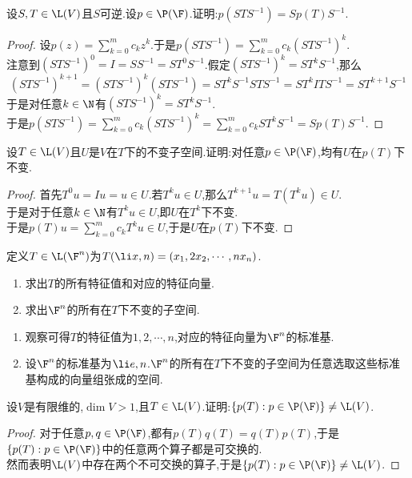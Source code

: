 \documentclass{ctexart}
\begin{document}
\begin{problem}[40.]
    设$S,T\in\L(V)$且$S$可逆.设$p\in\P(\F)$.证明:$p(STS^{-1})=Sp(T)S^{-1}$.
\end{problem}
\begin{proof}
    设$p(z)=\displaystyle\sum_{k=0}^{m}c_kz^k$.于是$\displaystyle p(STS^{-1})=\sum_{k=0}^{m}c_k(STS^{-1})^k$.\\
    注意到$(STS^{-1})^{0}=I=SS^{-1}=ST^0S^{-1}$.假定$(STS^{-1})^k=ST^kS^{-1}$,那么
    $$(STS^{-1})^{k+1}=(STS^{-1})^k(STS^{-1})=ST^{k}S^{-1}STS^{-1}=ST^{k}ITS^{-1}=ST^{k+1}S^{-1}$$
    于是对任意$k\in\N$有$(STS^{-1})^k=ST^kS^{-1}$.\\
    于是$\displaystyle p(STS^{-1})=\sum_{k=0}^{m}c_k(STS^{-1})^k=\sum_{k=0}^mc_kST^{k}S^{-1}=Sp(T)S^{-1}$.
\end{proof}
\begin{problem}[41.]
    设$T\in\L(V)$且$U$是$V$在$T$下的不变子空间.证明:对任意$p\in\P(\F)$,均有$U$在$p(T)$下不变.
\end{problem}
\begin{proof}
    首先$T^0u=Iu=u\in U$.若$T^ku\in U$,那么$T^{k+1}u=T(T^k u)\in U$.\\
    于是对于任意$k\in\N$有$T^ku\in U$,即$U$在$T^k$下不变.\\
    于是$\displaystyle p(T)u=\sum_{k=0}^{m}c_kT^ku\in U$,于是$U$在$p(T)$下不变.
\end{proof}
\begin{problem}[42.]
    定义$T\in\L(\F^n)$为$T(\li x,n)=(x_1,2x_2,\cdots,nx_n)$.
    \begin{enumerate}[label=\tbf{(\arabic*)}]
        \item 求出$T$的所有特征值和对应的特征向量.
        \item 求出$\F^n$的所有在$T$下不变的子空间.
    \end{enumerate}
\end{problem}
\begin{solution}[Solution.]
    \begin{enumerate}[label=\tbf{(\arabic*)}]
        \item 观察可得$T$的特征值为$1,2,\cdots,n$,对应的特征向量为$\F^n$的标准基.
        \item 设$\F^n$的标准基为$\li e,n$.$\F^n$的所有在$T$下不变的子空间为任意选取这些标准基构成的向量组张成的空间.
    \end{enumerate}
\end{solution}
\begin{problem}[43.]
    设$V$是有限维的,$\dim V>1$,且$T\in\L(V)$.证明:$\left\{p(T):p\in\P(\F)\right\}\neq\L(V)$.
\end{problem}
\begin{proof}
    对于任意$p,q\in\P(\F)$,都有$p(T)q(T)=q(T)p(T)$,于是$\left\{p(T):p\in\P(\F)\right\}$中的任意两个算子都是可交换的.\\
    然而表明$\L(V)$中存在两个不可交换的算子,于是$\left\{p(T):p\in\P(\F)\right\}\neq\L(V)$.
\end{proof}
\end{document}
